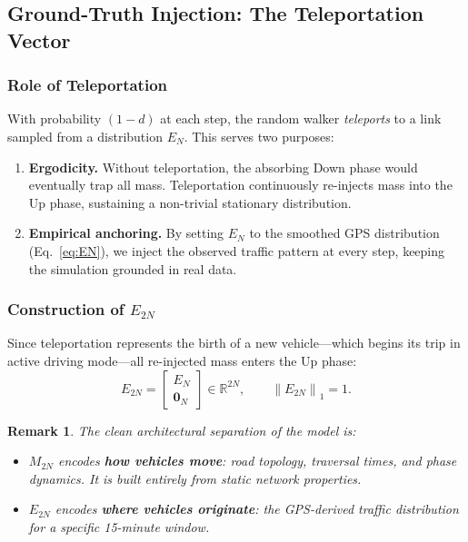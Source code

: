 \documentclass[12pt,a4paper]{article}
\theoremstyle{definition}
\theoremstyle{plain}
\newtheorem{remark}{Remark}[section]
\newcommand{\norm}[1]{\left\|#1\right\|}
\begin{document}
\subsection{Ground-Truth Injection: The Teleportation Vector}
\label{sec:teleport}

\subsubsection{Role of Teleportation}

With probability $(1-d)$ at each step, the random walker \emph{teleports} to a link
sampled from a distribution $E_N$. This serves two purposes:

\begin{enumerate}
  \item \textbf{Ergodicity.} Without teleportation, the absorbing Down phase would
    eventually trap all mass. Teleportation continuously re-injects mass into the Up
    phase, sustaining a non-trivial stationary distribution.
  \item \textbf{Empirical anchoring.} By setting $E_N$ to the smoothed GPS distribution
    (Eq.~\ref{eq:EN}), we inject the observed traffic pattern at every step, keeping
    the simulation grounded in real data.
\end{enumerate}

\subsubsection{Construction of $E_{2N}$}

Since teleportation represents the birth of a new vehicle---which begins its trip in
active driving mode---all re-injected mass enters the Up phase:
\begin{equation}
  \boxed{E_{2N} = \begin{bmatrix} E_N \\ \mathbf{0}_N \end{bmatrix}}
  \in \mathbb{R}^{2N}, \qquad \norm{E_{2N}}_1 = 1.
  \label{eq:E2N}
\end{equation}

\begin{remark}
  The clean architectural separation of the model is:
  \begin{itemize}
    \item $M_{2N}$ encodes \textbf{how vehicles move}: road topology, traversal times,
      and phase dynamics. It is built entirely from static network properties.
    \item $E_{2N}$ encodes \textbf{where vehicles originate}: the GPS-derived traffic
      distribution for a specific 15-minute window.
  \end{itemize}
\end{remark}
\end{document}
